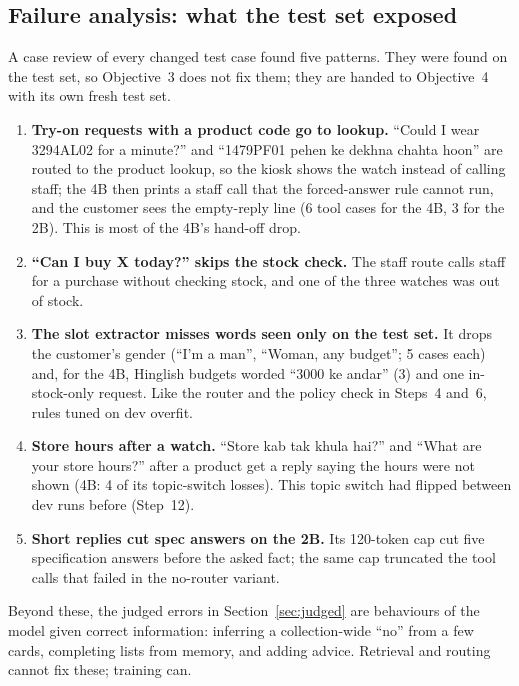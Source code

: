 \documentclass[11pt,a4paper]{article}
\begin{document}
\subsection{Failure analysis: what the test set exposed}\label{sec:failures}
A case review of every changed test case found five patterns. They were found on the test set, so Objective~3 does not
fix them; they are handed to Objective~4 with its own fresh test set.
\begin{enumerate}
  \item \textbf{Try-on requests with a product code go to lookup.} ``Could I wear 3294AL02 for a minute?'' and
        ``1479PF01 pehen ke dekhna chahta hoon'' are routed to the product lookup, so the kiosk shows the watch instead
        of calling staff; the 4B then prints a staff call that the forced-answer rule cannot run, and the customer sees
        the empty-reply line (6 tool cases for the 4B, 3 for the 2B). This is most of the 4B's hand-off drop.
  \item \textbf{``Can I buy X today?'' skips the stock check.} The staff route calls staff for a purchase without
        checking stock, and one of the three watches was out of stock.
  \item \textbf{The slot extractor misses words seen only on the test set.} It drops the customer's gender (``I'm a
        man'', ``Woman, any budget''; 5 cases each) and, for the 4B, Hinglish budgets worded ``3000 ke andar'' (3) and
        one in-stock-only request. Like the router and the policy check in Steps~4 and~6, rules tuned on dev overfit.
  \item \textbf{Store hours after a watch.} ``Store kab tak khula hai?'' and ``What are your store hours?'' after a
        product get a reply saying the hours were not shown (4B: 4 of its topic-switch losses). This topic switch had
        flipped between dev runs before (Step~12).
  \item \textbf{Short replies cut spec answers on the 2B.} Its 120-token cap cut five specification answers before the
        asked fact; the same cap truncated the tool calls that failed in the no-router variant.
\end{enumerate}
Beyond these, the judged errors in Section~\ref{sec:judged} are behaviours of the model given correct information:
inferring a collection-wide ``no'' from a few cards, completing lists from memory, and adding advice. Retrieval and
routing cannot fix these; training can.

\end{document}
